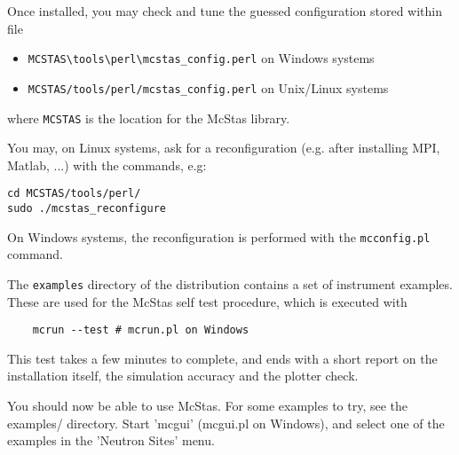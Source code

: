 Once installed, you may check and tune the guessed configuration stored within file
\begin{itemize}
\item{\verb+MCSTAS\tools\perl\mcstas_config.perl+ on Windows systems}
\item{\verb+MCSTAS/tools/perl/mcstas_config.perl+ on Unix/Linux systems}
\end{itemize}
where \verb+MCSTAS+ is the location for the McStas library.

You may, on Linux systems, ask for a reconfiguration (e.g. after installing MPI, Matlab, ...) with the commands, e.g:
\begin{verbatim}
cd MCSTAS/tools/perl/
sudo ./mcstas_reconfigure
\end{verbatim}
On Windows systems, the reconfiguration is performed with the \verb+mcconfig.pl+ command.

The \verb+examples+ directory of the distribution contains a set of instrument examples. These are used for the McStas self test procedure, which is executed with
\begin{verbatim}
    mcrun --test # mcrun.pl on Windows
\end{verbatim}
This test takes a few minutes to complete, and ends with a short report on the installation itself, the simulation accuracy and the plotter check.

You should now be able to use McStas. For some examples to try, see the
examples/ directory. Start 'mcgui' (mcgui.pl on Windows), and select one of the examples in the 'Neutron Sites' menu.
